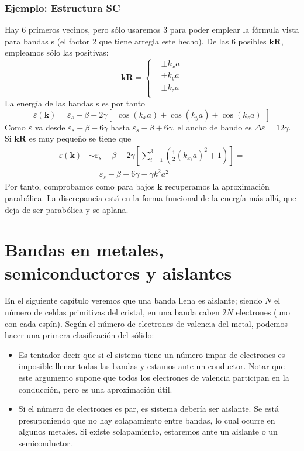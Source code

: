 \subsubsection{Ejemplo: Estructura SC}
Hay 6 primeros vecinos, pero sólo usaremos 3 para poder emplear la
fórmula vista para bandas s (el factor 2 que tiene arregla este
hecho). De las 6 posibles $\mathbf{k}\mathbf{R}$, empleamos sólo las
positivas:
\begin{equation}
  \mathbf{k}\mathbf{R} =
  \begin{cases}
    &\pm k_x a \\
    &\pm k_y a \\
    &\pm k_z a \\
  \end{cases}
\end{equation}
La energía de las bandas s es por tanto
\begin{equation}
  \varepsilon(\mathbf{k}) = \varepsilon_s - \beta - 2\gamma [\ \ \cos(k_x
  a) + \cos(k_y a) + \cos(k_z a)\ \ ]
\end{equation}
Como $\varepsilon$ va desde $\varepsilon_s - \beta - 6\gamma$ hasta
$\varepsilon_s - \beta + 6\gamma$, el ancho de bando es $\Delta
\varepsilon = 12\gamma$. Si $\mathbf{k}\mathbf{R}$ es muy pequeño se
tiene que
\begin{equation}
  \begin{split}
  \varepsilon (\mathbf{k}) &\sim \varepsilon_s - \beta - 2\gamma \left[
    \sum_{i=1}^3 \left( \frac{1}{2}(k_{x_i} a)^2 + 1 \right) \right] =
  \\ &= \varepsilon_s - \beta - 6\gamma - \gamma k^2 a^2
  \end{split}
\end{equation}
Por tanto, comprobamos como para bajos $\mathbf{k}$ recuperamos la
aproximación parabólica. La discrepancia está en la forma funcional de
la energía más allá, que deja de ser parabólica y se aplana.

\section{Bandas en metales, semiconductores y aislantes}
En el siguiente capítulo veremos que una banda llena es aislante;
siendo $N$ el número de celdas primitivas del cristal, en una banda
caben $2N$ electrones (uno con cada espín). Según el número de
electrones de valencia del metal, podemos hacer una primera
clasificación del sólido:

\begin{itemize}
\item Es tentador decir que si el sistema tiene un número
  impar de electrones es imposible llenar todas las bandas y estamos
  ante un conductor. Notar que este argumento supone que todos los
  electrones de valencia participan en la conducción, pero es una
  aproximación útil.
\item Si el número de electrones es par, es sistema debería ser
  aislante. Se está presuponiendo que no hay solapamiento entre
  bandas, lo cual ocurre en algunos metales. Si existe solapamiento,
  estaremos ante un aislante o un semiconductor.
\end{itemize}

